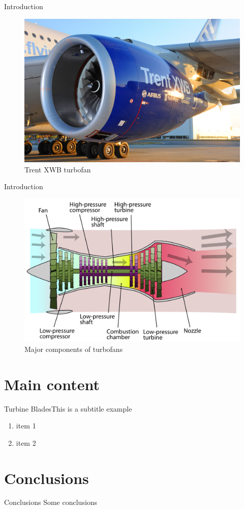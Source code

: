 \documentclass[LaTeX2e,10pt]{beamer}
\begin{document}
\begin{frame}{Introduction}
	\vskip7pt
\begin{figure}[h!]
	\centering
	\includegraphics[width=0.9\linewidth]{Graphics/A350_XWB.jpg}
	\caption{Trent XWB turbofan}
	\label{fig:xwb}
\end{figure}
\end{frame}

\begin{frame}{Introduction}
	\vskip7pt
	\begin{figure}[h!]
		\centering
		\includegraphics[width=0.9\linewidth]{Graphics/2000px-Turbofan_operation.png}
		\caption{Major components of turbofans}
		\label{fig:turbofan}
	\end{figure}
\end{frame}

\section{Main content}

\begin{frame}{Turbine Blades}{This is a subtitle example}
	\begin{enumerate} [<+->]
		\item item 1
		\item item 2
	\end{enumerate}
\end{frame}

\section{Conclusions}

\begin{frame}{Conclusions}
	Some conclusions
\end{frame}
\end{document}
